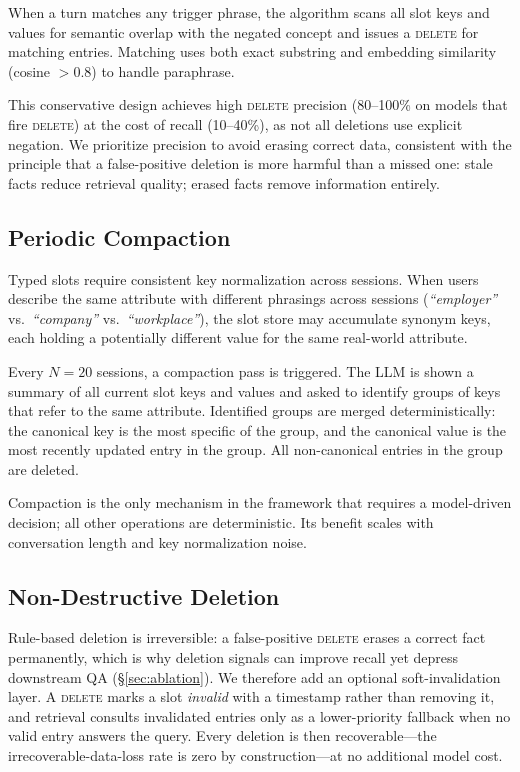 \documentclass[10pt, twocolumn]{article}
\begin{document}
When a turn matches any trigger phrase, the algorithm scans all slot keys
and values for semantic overlap with the negated concept and issues a
\textsc{delete} for matching entries.
Matching uses both exact substring and embedding similarity (cosine $> 0.8$)
to handle paraphrase.

This conservative design achieves high \textsc{delete} precision
(80--100\% on models that fire \textsc{delete}) at the cost of recall
(10--40\%), as not all deletions use explicit negation.
We prioritize precision to avoid erasing correct data, consistent with the
principle that a false-positive deletion is more harmful than a missed one:
stale facts reduce retrieval quality; erased facts remove information entirely.

\subsection{Periodic Compaction}
\label{sec:compaction}

Typed slots require consistent key normalization across sessions.
When users describe the same attribute with different phrasings across
sessions (\emph{``employer''} vs.\ \emph{``company''} vs.\
\emph{``workplace''}), the slot store may accumulate synonym keys, each
holding a potentially different value for the same real-world attribute.

Every $N=20$ sessions, a compaction pass is triggered.
The LLM is shown a summary of all current slot keys and values and asked
to identify groups of keys that refer to the same attribute.
Identified groups are merged deterministically: the canonical key is the
most specific of the group, and the canonical value is the most recently
updated entry in the group.
All non-canonical entries in the group are deleted.

Compaction is the only mechanism in the framework that requires a
model-driven decision; all other operations are deterministic.
Its benefit scales with conversation length and key normalization noise.

\subsection{Non-Destructive Deletion}
\label{sec:softdel}

Rule-based deletion is irreversible: a false-positive \textsc{delete} erases a
correct fact permanently, which is why deletion signals can improve recall yet
depress downstream QA (\S\ref{sec:ablation}). We therefore add an optional
soft-invalidation layer. A \textsc{delete} marks a slot \emph{invalid} with a
timestamp rather than removing it, and retrieval consults invalidated entries
only as a lower-priority fallback when no valid entry answers the query. Every
deletion is then recoverable---the irrecoverable-data-loss rate is zero by
construction---at no additional model cost.
\end{document}
